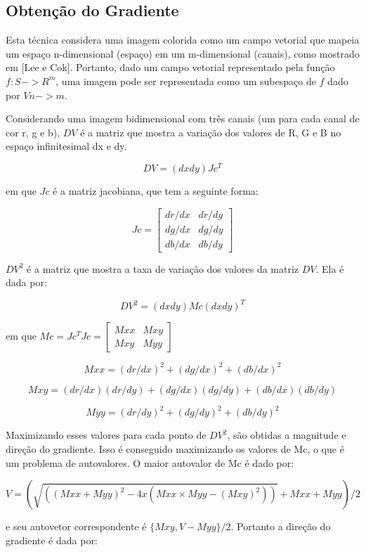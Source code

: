 
\subsection{Obtenção do Gradiente}

Esta técnica considera uma imagem colorida como um campo vetorial que mapeia um espaço n-dimensional (espaço) em um m-dimensional (canais), como mostrado em [Lee e Cok]. Portanto, dado um campo vetorial representado pela função $ f: S->R^m $, uma imagem pode ser representada como um subespaço de $f$ dado por $ Vn->m $.

Considerando uma imagem bidimensional com três canais (um para cada canal de cor r, g e b), $DV$ é a matriz que mostra a variação dos valores de R, G e B no espaço infinitesimal dx e dy. 

$$ DV = (dx dy)Jc^T $$ 

em que $Jc$ é a matriz jacobiana, que tem a seguinte forma:

$$ Jc = \begin{bmatrix} dr/dx & dr/dy \\ dg/dx & dg/dy \\ db/dx & db/dy \end{bmatrix} $$

$ DV^2 $ é a matriz que mostra a taxa de variação dos valores da matriz $DV$. Ela é dada por:

$$ DV^2 = (dx dy)Mc(dx dy)^T $$

em que $ Mc = Jc^T Jc = \begin{bmatrix} Mxx & Mxy \\ Mxy & Myy \end{bmatrix}$

$$ Mxx = (dr/dx)^2+(dg/dx)^2+(db/dx)^2 $$

$$ Mxy = (dr/dx)(dr/dy)+(dg/dx)(dg/dy)+(db/dx)(db/dy) $$

$$ Myy = (dr/dy)^2+(dg/dy)^2+(db/dy)^2 $$

Maximizando esses valores para cada ponto de $ DV^2 $, são obtidas a magnitude e direção do gradiente. Isso é conseguido maximizando os valores de Mc, o que é um problema de autovalores. O maior autovalor de Mc é dado por:

$$ V = (\sqrt{( (Mxx+Myy)^2 - 4 x(Mxx \times Myy - (Mxy)^2 ) )}+Mxx+ Myy)/2 $$

e seu autovetor correspondente é $ \{Mxy,V-Myy\}/2 $. Portanto a direção do gradiente é dada por:

